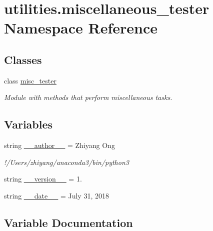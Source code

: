 \hypertarget{namespaceutilities_1_1miscellaneous__tester}{}\section{utilities.\+miscellaneous\+\_\+tester Namespace Reference}
\label{namespaceutilities_1_1miscellaneous__tester}
\subsection*{Classes}
\begin{DoxyCompactItemize}
\item 
class \hyperlink{classutilities_1_1miscellaneous__tester_1_1misc__tester}{misc\+\_\+tester}
\begin{DoxyCompactList}\small\item\em Module with methods that perform miscellaneous tasks. \end{DoxyCompactList}\end{DoxyCompactItemize}
\subsection*{Variables}
\begin{DoxyCompactItemize}
\item 
string \hyperlink{namespaceutilities_1_1miscellaneous__tester_a1a0c5633611c3237a48f9d89ede7afdb}{\+\_\+\+\_\+author\+\_\+\+\_\+} = \textquotesingle{}Zhiyang Ong\textquotesingle{}
\begin{DoxyCompactList}\small\item\em !/\+Users/zhiyang/anaconda3/bin/python3 \end{DoxyCompactList}\item 
string \hyperlink{namespaceutilities_1_1miscellaneous__tester_a5cf71bb548a296685a4ce1abafa02ad4}{\+\_\+\+\_\+version\+\_\+\+\_\+} = \textquotesingle{}1.\textquotesingle{}
\item 
string \hyperlink{namespaceutilities_1_1miscellaneous__tester_a809790ee7c8c8154544259eed38d29b4}{\+\_\+\+\_\+date\+\_\+\+\_\+} = \textquotesingle{}July 31, 2018\textquotesingle{}
\end{DoxyCompactItemize}


\subsection{Variable Documentation}
\hypertarget{namespaceutilities_1_1miscellaneous__tester_a1a0c5633611c3237a48f9d89ede7afdb}{}
